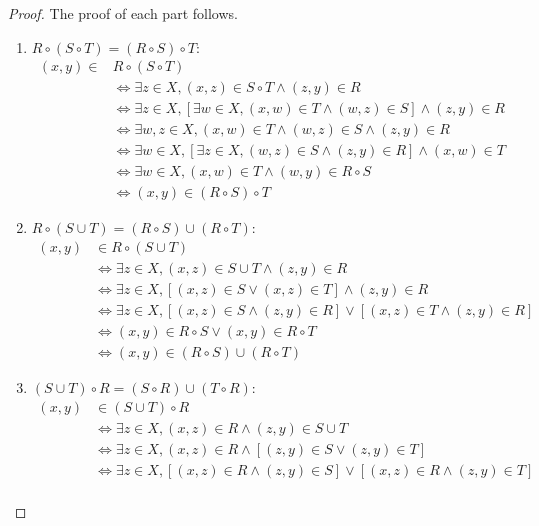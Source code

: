 \documentclass[
  letterpaper,
  10pt,
  reqno,
  twopage,
  openany]{book}
\theoremstyle{plain}
\theoremstyle{definition}
\theoremstyle{definition}
\theoremstyle{definition}
\theoremstyle{plain}
\theoremstyle{plain}
\theoremstyle{remark}
\begin{document}
\begin{proof}

The proof of each part follows.

\begin{enumerate}
\def\labelenumi{(\arabic{enumi})}
\item
  \(R\circ (S\circ T)=(R\circ S)\circ T\): \begin{align*}
  (x,y)\in & R\circ (S\circ T) \\
  & \Longleftrightarrow \exists z\in X, (x,z)\in S\circ T \land (z,y)\in R\\
  & \Longleftrightarrow \exists z\in X, [ \exists w\in X, (x,w)\in T \land (w,z)\in S ] \land  (z,y)\in R \\
  & \Longleftrightarrow \exists w, z\in X, (x,w)\in T \land (w,z)\in S \land (z,y)\in R\\
  & \Longleftrightarrow \exists w\in X, [\exists z\in X, (w,z)\in S \land (z,y)\in R] \land (x,w)\in T\\
  & \Longleftrightarrow \exists w\in X, (x,w)\in T \land (w,y)\in R\circ S \\
  & \Longleftrightarrow (x,y)\in (R\circ S) \circ T 
  \end{align*}
\item
  \(R\circ (S\cup T)=(R\circ S)\cup (R\circ T)\): \begin{align*}
  (x,y) & \in R\circ (S\cup T) \\
  & \Longleftrightarrow \exists z\in X, (x,z)\in S \cup T \land (z,y)\in R \\
  & \Longleftrightarrow \exists z\in X, [(x,z)\in S \lor (x,z)\in T ]  \land (z,y)\in R \\
  & \Longleftrightarrow \exists z\in X, [(x,z)\in S \land (z,y)\in R] \lor [(x,z)\in T \land (z,y)\in R]\\
  & \Longleftrightarrow (x,y)\in R\circ S \lor (x,y)\in R\circ T\\
  & \Longleftrightarrow (x,y)\in (R\circ S)\cup (R \circ T) 
  \end{align*}
\item
  \((S\cup T)\circ R=(S\circ R)\cup (T\circ R)\): \begin{align*}
  (x,y) & \in (S\cup T)\circ R \\
  & \Longleftrightarrow \exists z\in X, (x,z)\in R \land (z,y)\in S\cup T\\
  & \Longleftrightarrow \exists z\in X, (x,z)\in R \land [(z,y)\in S\lor (z,y)\in T] \\
  & \Longleftrightarrow \exists z\in X, [(x,z)\in R \land (z,y)\in S] \lor  [(x,z)\in R \land (z,y)\in T] \\

\end{align*}
\end{enumerate}
\end{proof}
\end{document}
